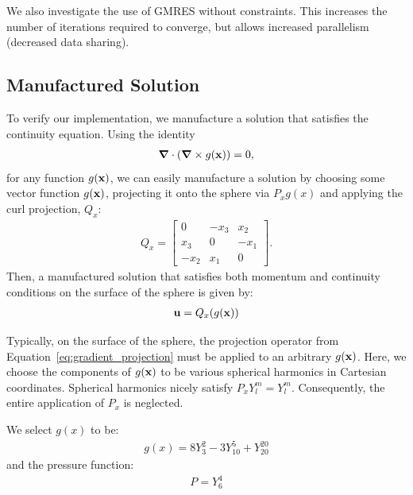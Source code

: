 We also investigate the use of GMRES without constraints. This increases the number of iterations required to converge, but allows increased parallelism (decreased data sharing). %

\subsection{Manufactured Solution}

To verify our implementation, we manufacture a solution that satisfies the continuity equation. Using the identity
\begin{align*} 
\mbox{\boldmath$ \nabla $} \cdot (\mbox{\boldmath$ \nabla $} \times g(\mathbf{x})) = 0,
\end{align*} 
for any function $g(\mathbf{x})$, we can easily manufacture a solution by choosing some vector function $g(\mathbf{x})$, projecting it onto the sphere via $P_x g(x)$ and applying the curl projection, $Q_x$: 
\begin{align*} 
Q_x = \begin{bmatrix} 0 & -x_3 & x_2 \\ x_3 & 0 & -x_1 \\ -x_2 & x_1 & 0 \end{bmatrix}.
\end{align*} 
Then, a manufactured solution that satisfies both momentum and continuity conditions on the surface of the sphere is given by: 
\begin{align*} 
\mathbf{u} = Q_x (g(\mathbf{x}))
\end{align*} 

Typically, on the surface of the sphere, the projection operator from Equation~\ref{eq:gradient_projection} must be applied to an arbitrary $g(\mathbf{x})$. 
Here, we choose the components of $g(\mathbf{x})$ to be various spherical harmonics in Cartesian coordinates. Spherical harmonics nicely satisfy $P_x Y_l^m = Y_l^m$. Consequently, the entire application of $P_x$ is neglected. 



We select $g(x)$ to be: 
\begin{align}
g(x) = 8 Y_{3}^{2} - 3Y_{10}^{5} + Y_{20}^{20} 
\end{align}
and the pressure function:
\begin{align}
P = Y_6^4 
\end{align} 

